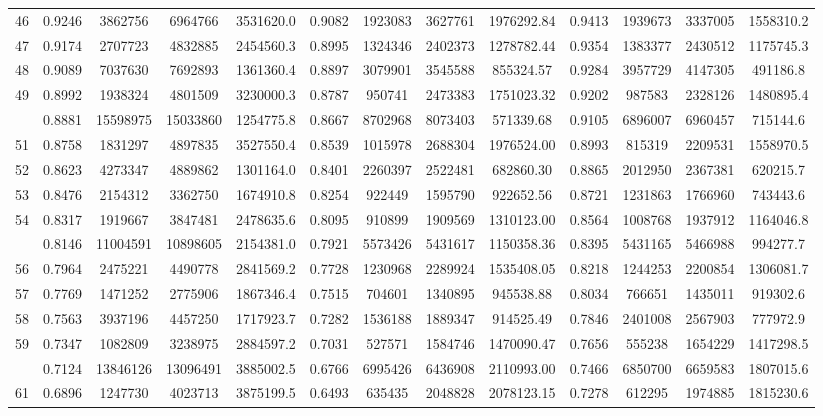 \documentclass[
  12pt,
]{article}
\begin{document}
\begin{longtable}[t]{lcccccccccccc}
46 & 0.9246 & 3862756 & 6964766 & 3531620.0 & 0.9082 & 1923083 & 3627761 & 1976292.84 & 0.9413 & 1939673 & 3337005 & 1558310.2\\
47 & 0.9174 & 2707723 & 4832885 & 2454560.3 & 0.8995 & 1324346 & 2402373 & 1278782.44 & 0.9354 & 1383377 & 2430512 & 1175745.3\\
48 & 0.9089 & 7037630 & 7692893 & 1361360.4 & 0.8897 & 3079901 & 3545588 & 855324.57 & 0.9284 & 3957729 & 4147305 & 491186.8\\
49 & 0.8992 & 1938324 & 4801509 & 3230000.3 & 0.8787 & 950741 & 2473383 & 1751023.32 & 0.9202 & 987583 & 2328126 & 1480895.4\\
\addlinespace
50 & 0.8881 & 15598975 & 15033860 & 1254775.8 & 0.8667 & 8702968 & 8073403 & 571339.68 & 0.9105 & 6896007 & 6960457 & 715144.6\\
51 & 0.8758 & 1831297 & 4897835 & 3527550.4 & 0.8539 & 1015978 & 2688304 & 1976524.00 & 0.8993 & 815319 & 2209531 & 1558970.5\\
52 & 0.8623 & 4273347 & 4889862 & 1301164.0 & 0.8401 & 2260397 & 2522481 & 682860.30 & 0.8865 & 2012950 & 2367381 & 620215.7\\
53 & 0.8476 & 2154312 & 3362750 & 1674910.8 & 0.8254 & 922449 & 1595790 & 922652.56 & 0.8721 & 1231863 & 1766960 & 743443.6\\
54 & 0.8317 & 1919667 & 3847481 & 2478635.6 & 0.8095 & 910899 & 1909569 & 1310123.00 & 0.8564 & 1008768 & 1937912 & 1164046.8\\
\addlinespace
55 & 0.8146 & 11004591 & 10898605 & 2154381.0 & 0.7921 & 5573426 & 5431617 & 1150358.36 & 0.8395 & 5431165 & 5466988 & 994277.7\\
56 & 0.7964 & 2475221 & 4490778 & 2841569.2 & 0.7728 & 1230968 & 2289924 & 1535408.05 & 0.8218 & 1244253 & 2200854 & 1306081.7\\
57 & 0.7769 & 1471252 & 2775906 & 1867346.4 & 0.7515 & 704601 & 1340895 & 945538.88 & 0.8034 & 766651 & 1435011 & 919302.6\\
58 & 0.7563 & 3937196 & 4457250 & 1717923.7 & 0.7282 & 1536188 & 1889347 & 914525.49 & 0.7846 & 2401008 & 2567903 & 777972.9\\
59 & 0.7347 & 1082809 & 3238975 & 2884597.2 & 0.7031 & 527571 & 1584746 & 1470090.47 & 0.7656 & 555238 & 1654229 & 1417298.5\\
\addlinespace
60 & 0.7124 & 13846126 & 13096491 & 3885002.5 & 0.6766 & 6995426 & 6436908 & 2110993.00 & 0.7466 & 6850700 & 6659583 & 1807015.6\\
61 & 0.6896 & 1247730 & 4023713 & 3875199.5 & 0.6493 & 635435 & 2048828 & 2078123.15 & 0.7278 & 612295 & 1974885 & 1815230.6\\

\end{longtable}
\end{document}
